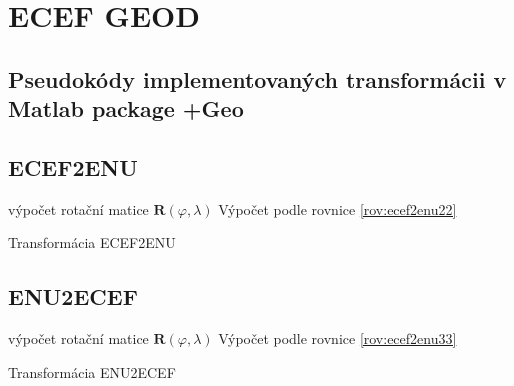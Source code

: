 \documentclass[11pt,a4paper]{article}
\begin{document}
\section{ECEF GEOD}






 





\begin{appendices}

\section{Pseudokódy implementovaných transformácii v Matlab package +Geo}

\subsection{ECEF2ENU} \label{appEcef2Enu}

\begin{algorithm}[H]
 výpočet rotační matice $\mathbf{R}\left(\varphi, \lambda\right)$\;	
 Výpočet podle rovnice \ref{rov:ecef2enu22}
 \caption{Transformácia ECEF2ENU}
\end{algorithm} 

\subsection{ENU2ECEF} \label{appEnu2Ecef}

\begin{algorithm}[H]
 výpočet rotační matice $\mathbf{R}\left(\varphi, \lambda\right)$\;	
 Výpočet podle rovnice \ref{rov:ecef2enu33}
 \caption{Transformácia ENU2ECEF}
\end{algorithm} 



\end{appendices}
\end{document}
